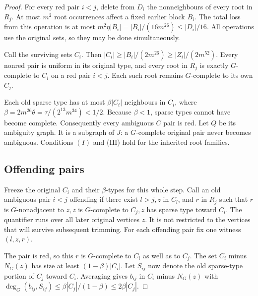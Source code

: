 \documentclass[11pt,a4paper]{article}
\theoremstyle{definition}
\theoremstyle{remark}
\numberwithin{equation}{section}
\begin{document}
\begin{proof}
For every red pair \(i<j\), delete from \(D_{i}\) the nonneighbours of every root in \(R_{j}\). At most \(m^{2}\) root occurrences affect a fixed earlier block \(B_{i}\). The total loss from this operation is at most \(m^{2} \eta |B_{i}| = |B_{i}|/(16m^{26}) \le\allowbreak  |D_{i}|/16\). All operations use the original sets, so they may be done simultaneously.

Call the surviving sets \(C_{i}\). Then \(|C_{i}| \ge\allowbreak  |B_{i}|/(2m^{26}) \ge\allowbreak  |Z_{i}|/(2m^{52})\). Every nonred pair is uniform in its original type, and every root in \(R_{j}\) is exactly \(G\)-complete to \(C_{i}\) on a red pair \(i<j\). Each such root remains \(G\)-complete to its own \(C_{j}\).

Each old sparse type has at most \(\beta |C_{i}|\) neighbours in \(C_{i}\), where \(\beta = 2m^{26} \theta = \tau/(2^{13} m^{34}) < 1/2\). Because \(\beta<1\), sparse types cannot have become complete. Consequently every ambiguous \(C\) pair is red. Let \(Q\) be its ambiguity graph. It is a subgraph of \(J\): a \(G\)-complete original pair never becomes ambiguous. Conditions \((I)\) and (III) hold for the inherited root families.


\subsection{Offending pairs}\label{subsec:rp6-offending}
Freeze the original \(C_{i}\) and their \(\beta\)-types for this whole step. Call an old ambiguous pair \(i<j\) offending if there exist \(l>j,\allowbreak  z\) in \(C_{l}\), and \(r\) in \(R_{j}\) such that \(r\) is \(G\)-nonadjacent to \(z,\allowbreak  z\) is \(G\)-complete to \(C_{j},\allowbreak  z\) has sparse type toward \(C_{i}\). The quantifier runs over all later original vertices \(z\). It is not restricted to the vertices that will survive subsequent trimming. For each offending pair fix one witness \((l,\allowbreak z,\allowbreak r)\).

The pair is red, so this \(r\) is \(G\)-complete to \(C_{i}\) as well as to \(C_{j}\). The set \(C_{i}\) minus \(N_{G}(z)\) has size at least \((1-\beta)|C_{i}|\). Let \(S_{ij}\) now denote the old sparse-type portion of \(C_{j}\) toward \(C_{i}\). Averaging gives \(b_{ij}\) in \(C_{i}\) minus \(N_{G}(z)\) with \(\deg _{G}(b_{ij},\allowbreak S_{ij}) \le\allowbreak  \beta |C_{j}|/(1-\beta) \le\allowbreak  2 \beta |C_{j}|\).


\end{proof}
\end{document}
